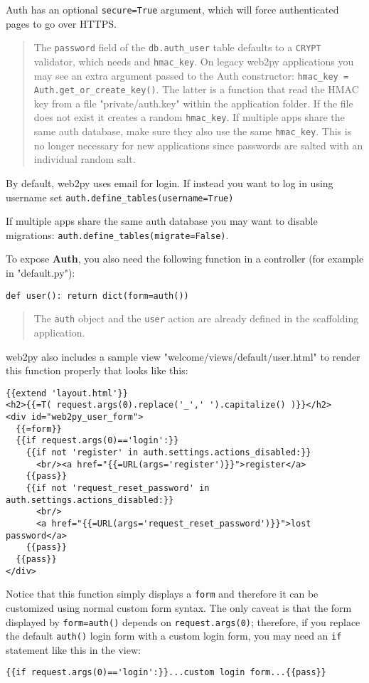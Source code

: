 \documentclass[justified,sixbynine,notoc]{tufte-book}
\def\ft{\small\tt}
\def\inxx#1{\index{#1}}
\begin{document}
\begin{fullwidth}
Auth has an optional {\ft secure=True} argument, which will force authenticated pages to go over HTTPS. \inxx{https}

\begin{quote}The {\ft password} field of the {\ft db.auth\_user} table defaults to a {\ft CRYPT} validator, which needs and {\ft hmac\_key}. On legacy web2py applications you may see an extra argument passed to the Auth constructor: {\ft hmac\_key = Auth.get\_or\_create\_key()}. The latter is a function that read the HMAC key from a file "private/auth.key" within the application folder. If the file does not exist it creates a random {\ft hmac\_key}. If multiple apps share the same auth database, make sure they also use the same {\ft hmac\_key}. This is no longer necessary for new applications since passwords are salted with an individual random salt.\end{quote}
By default, web2py uses email for login. If instead you want to log in using username set {\ft auth.define\_tables(username=True)}

If multiple apps share the same auth database you may want to disable migrations: {\ft auth.define\_tables(migrate=False)}.

To expose {\bf Auth}, you also need the following function in a controller (for example in "default.py"):
\begin{lstlisting}
def user(): return dict(form=auth())
\end{lstlisting}

\begin{quote}The {\ft auth} object and the {\ft user} action are already defined in the
scaffolding application.\end{quote}
web2py also includes a sample view "welcome/views/default/user.html" to render this function properly that looks like this:
\begin{lstlisting}[keywords={}]
{{extend 'layout.html'}}
<h2>{{=T( request.args(0).replace('_',' ').capitalize() )}}</h2>
<div id="web2py_user_form">
  {{=form}}
  {{if request.args(0)=='login':}}
    {{if not 'register' in auth.settings.actions_disabled:}}
      <br/><a href="{{=URL(args='register')}}">register</a>
    {{pass}}
    {{if not 'request_reset_password' in auth.settings.actions_disabled:}}
      <br/>
      <a href="{{=URL(args='request_reset_password')}}">lost password</a>
    {{pass}}
  {{pass}}
</div>
\end{lstlisting}

Notice that this function simply displays a {\ft form} and therefore it can be customized using normal custom form syntax. The only caveat is that the form displayed by {\ft form=auth()} depends on {\ft request.args(0)}; therefore, if you replace the default {\ft auth()} login form with a custom login form, you may need an {\ft if} statement like this in the view:
\begin{lstlisting}[keywords={}]
{{if request.args(0)=='login':}}...custom login form...{{pass}}
\end{lstlisting}


\end{fullwidth}
\end{document}
